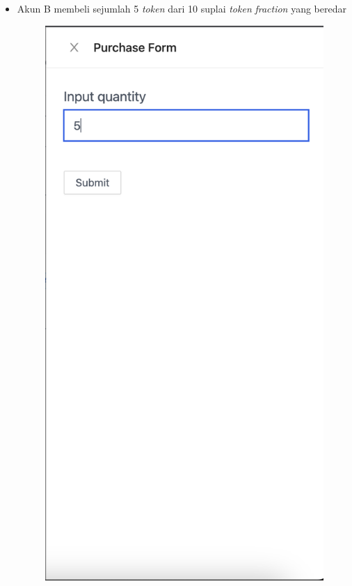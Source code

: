 \begin{itemize}
      \item Akun B membeli sejumlah 5 \emph{token} dari 10 suplai \emph{token} \emph{fraction} yang beredar
        \begin{figure} [H] \centering
            \includegraphics[scale=0.4]{gambar/img-test-share-buy-1.png}

\end{figure}
\end{itemize}
